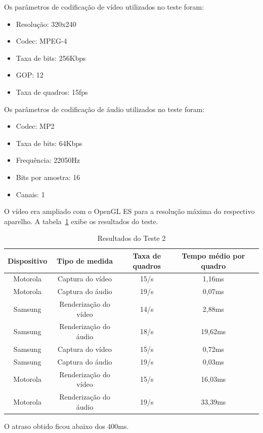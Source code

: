 \documentclass{acm_proc_article-sp}
\begin{document}
Os parâmetros de codificação de vídeo utilizados no teste foram:
\begin{itemize}
 \item Resolução: 320x240
 \item Codec: MPEG-4
 \item Taxa de bits: 256Kbps
 \item GOP: 12
 \item Taxa de quadros: 15fps
\end{itemize}
Os parâmetros de codificação de áudio utilizados no teste foram:
\begin{itemize}
 \item Codec: MP2
 \item Taxa de bits: 64Kbps
 \item Frequência: 22050Hz
 \item Bits por amostra: 16
 \item Canais: 1
\end{itemize}
O vídeo era ampliado com o OpenGL ES para a resolução máxima do respectivo aparelho. A tabela~\ref{tabela_teste2} exibe os resultados do teste.
\begin{table}
\centering
\caption{Resultados do Teste 2}
\label{tabela_teste2}
\begin{tabular}{|c|c|c|c|l} \hline
Dispositivo&Tipo de medida&Taxa de quadros&Tempo médio por quadro\\ \hline
Motorola&Captura do vídeo&15/s&1,16ms\\ \hline
Motorola&Captura do áudio&19/s&0,07ms\\ \hline
Samsung&Renderização do vídeo&14/s&2,88ms\\ \hline
Samsung&Renderização do áudio&18/s&19,62ms\\ \hline
Samsung&Captura do vídeo&15/s&0,72ms\\ \hline
Samsung&Captura do áudio&19/s&0,03ms\\ \hline
Motorola&Renderização do vídeo&15/s&16,03ms\\ \hline
Motorola&Renderização do áudio&19/s&33,39ms\\
\hline\end{tabular}
\end{table}
O atraso obtido ficou abaixo dos 400ms.
\end{document}
